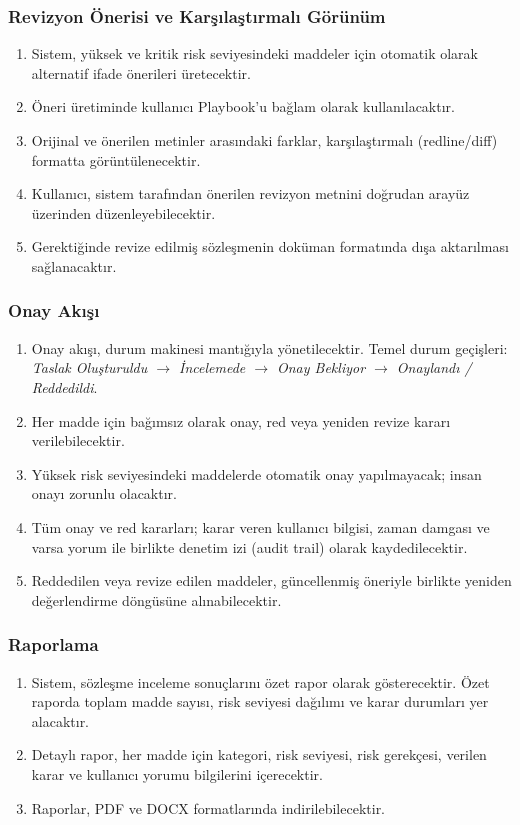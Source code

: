 \documentclass[12pt, a4paper]{article}
\begin{document}
\subsubsection{Revizyon Önerisi ve Karşılaştırmalı Görünüm}
\begin{enumerate}[leftmargin=2cm]
    \item Sistem, yüksek ve kritik risk seviyesindeki maddeler için otomatik olarak alternatif ifade önerileri üretecektir.
    \item Öneri üretiminde kullanıcı Playbook'u bağlam olarak kullanılacaktır.
    \item Orijinal ve önerilen metinler arasındaki farklar, karşılaştırmalı (redline/diff) formatta görüntülenecektir.
    \item Kullanıcı, sistem tarafından önerilen revizyon metnini doğrudan arayüz üzerinden düzenleyebilecektir.
    \item Gerektiğinde revize edilmiş sözleşmenin doküman formatında dışa aktarılması sağlanacaktır.
\end{enumerate}

\subsubsection{Onay Akışı}
\begin{enumerate}[leftmargin=2cm]
    \item Onay akışı, durum makinesi mantığıyla yönetilecektir. Temel durum geçişleri: \textit{Taslak Oluşturuldu $\rightarrow$ İncelemede $\rightarrow$ Onay Bekliyor $\rightarrow$ Onaylandı / Reddedildi}.
    \item Her madde için bağımsız olarak onay, red veya yeniden revize kararı verilebilecektir.
    \item Yüksek risk seviyesindeki maddelerde otomatik onay yapılmayacak; insan onayı zorunlu olacaktır.
    \item Tüm onay ve red kararları; karar veren kullanıcı bilgisi, zaman damgası ve varsa yorum ile birlikte denetim izi (audit trail) olarak kaydedilecektir.
    \item Reddedilen veya revize edilen maddeler, güncellenmiş öneriyle birlikte yeniden değerlendirme döngüsüne alınabilecektir.
\end{enumerate}

\subsubsection{Raporlama}
\begin{enumerate}[leftmargin=2cm]
    \item Sistem, sözleşme inceleme sonuçlarını özet rapor olarak gösterecektir. Özet raporda toplam madde sayısı, risk seviyesi dağılımı ve karar durumları yer alacaktır.
    \item Detaylı rapor, her madde için kategori, risk seviyesi, risk gerekçesi, verilen karar ve kullanıcı yorumu bilgilerini içerecektir.
    \item Raporlar, PDF ve DOCX formatlarında indirilebilecektir.
\end{enumerate}
\end{document}
